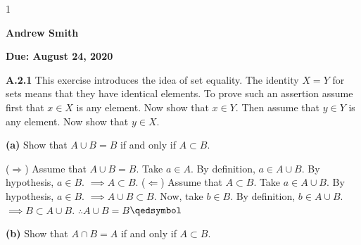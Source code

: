 \documentclass[12pt]{article}
\newcommand{\duedate}{August 24, 2020}
\newcommand{\yourname}{Andrew Smith}
\def\printsolutions{1}
\begin{document}
\if\printsolutions1
\begin{center}
\textbf{\Large \yourname}
\end{center}
\else
\begin{center}
\textbf{\Large Due: \duedate}
\end{center}
\fi


\begin{problem}
\textbf{A.2.1} This exercise introduces the idea of set equality. The identity $X = Y$ for sets means that they have identical elements. To prove such an assertion assume first that $x \in X$ is any element. Now show that $x \in Y$. Then assume that $y \in Y$ is any element. Now show that $y \in X$.
\end{problem}
\begin{subproblem}\textbf{(a)}
Show that $A\cup B = B$ if and only if $A\subset B$.
\end{subproblem}

\begin{solution}\newline
($\Rightarrow$) Assume that $A\cup B = B$.\newline
Take $a\in A$.\newline
By definition, $a\in A\cup B$.\newline
By hypothesis, $a\in B$.\newline
$\implies A\subset B$.\newline
($\Leftarrow$) Assume that $A\subset B$.\newline
Take $a\in A\cup B$.\newline
By hypothesis, $a\in B$.\newline
$\implies A\cup B\subset B$.\newline
Now, take $b\in B$.\newline
By definition, $b\in A\cup B$.\newline
$\implies B\subset A\cup B$.\newline
$\therefore A\cup B = B$\flushright $\qedsymbol$
\end{solution}
\newpage
\begin{subproblem}\textbf{(b)}
Show that $A \cap B = A$ if and only if $A \subset B$.
\end{subproblem}
\end{document}
